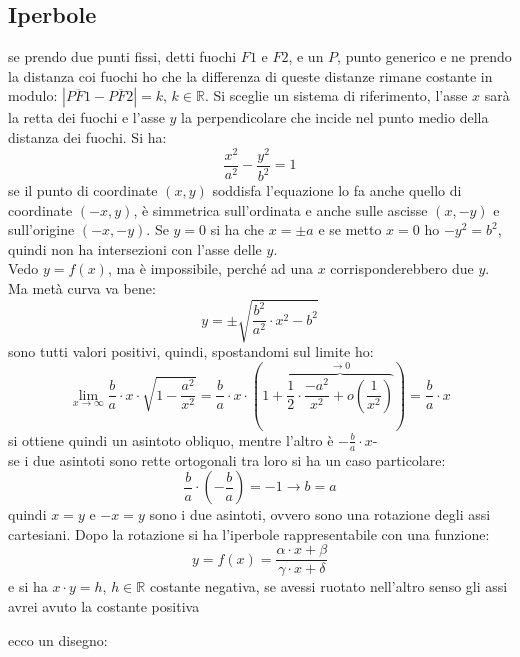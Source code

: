 \documentclass[a4paper,12pt, oneside]{book}
\begin{document}
\subsection{Iperbole}
\begin{definizione}
	se prendo due punti fissi, detti fuochi $F1$ e $F2$, e un $P$, punto generico e ne prendo la distanza coi fuochi ho che la differenza di queste distanze rimane costante in modulo: $|\overline{PF1}-\overline{PF2}|=k,\, k\in \mathbb{R}$. Si sceglie un sistema di riferimento, l'asse $x$ sarà la retta dei fuochi e l'asse $y$ la perpendicolare che incide nel punto medio della distanza dei fuochi. Si ha:
	$$\frac{x^2}{a^2}-\frac{y^2}{b^2}=1$$
	se il punto di coordinate $(x,y)$ soddisfa l'equazione lo fa anche quello di coordinate $(-x,y)$, è simmetrica sull'ordinata e anche sulle ascisse $(x,-y)$ e sull'origine $(-x,-y)$. Se $y=0$ si ha che $x=\pm a$ e se metto $x=0$ ho $-y^2= b^2$, quindi non ha intersezioni con l'asse delle $y$. \\ Vedo $y=f(x)$, ma è impossibile, perché ad una $x$ corrisponderebbero due $y$. Ma metà curva va bene:
	$$y=\pm\sqrt{\frac{b^2}{a^2}\cdot x^2-b^2}$$
	sono tutti valori positivi, quindi, spostandomi sul limite ho:
	$$\lim_{x\to\infty} \frac{b}{a}\cdot x\cdot \sqrt{1-\frac{a^2}{x^2}}= \frac{b}{a}\cdot x\cdot \left(1+\overbrace{\frac{1}{2}\cdot \frac{-a^2}{x^2}+o\left(\frac{1}{x^2}\right)}^{\to 0}\right)=\frac{b}{a}\cdot x$$
	si ottiene quindi un asintoto obliquo, mentre l'altro è  $-\frac{b}{a}\cdot x$-\\ se i due asintoti sono rette ortogonali tra loro si ha un caso particolare:
	$$\frac{b}{a}\cdot \left(-\frac{b}{a}\right)=-1\longrightarrow b=a$$
	quindi $x=y$ e $ -x=y$ sono i due asintoti, ovvero sono una rotazione degli assi cartesiani. Dopo la rotazione si ha l'iperbole rappresentabile con una funzione:
	$$y=f(x)=\frac{\alpha\cdot x +\beta}{\gamma\cdot x +\delta}$$
	e si ha $x\cdot y=h,\, h\in \mathbb{R}$ costante negativa, se avessi ruotato nell'altro senso gli assi avrei avuto la costante positiva

	ecco un disegno:
	\begin{center}


\end{center}
\end{definizione}
\end{document}
